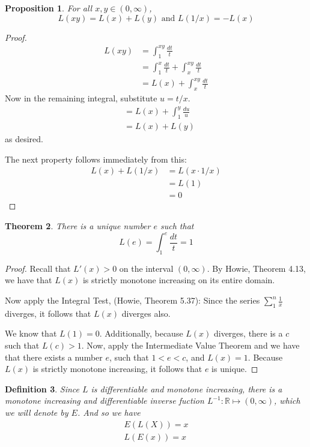 \documentclass[12pt]{article}
\theoremstyle{mystyle}
\newtheorem{thm}{Theorem}
\newtheorem{defn}[thm]{Definition}
\newtheorem{prop}[thm]{Proposition}
\newcommand{\R}{\mathbb{R}}
\begin{document}
\begin{prop}
  For all $x,y \in (0, \infty)$,
  $$ L(xy) = L(x) + L(y) \text{ and } L(1/x) = -L(x)$$
\end{prop}
\begin{proof}
  \begin{align*}
    L(xy) &= \int_{1}^{xy} \frac{dt}{t} \\
          &= \int_{1}^{x} \frac{dt}{t} + \int_{x}^{xy} \frac{dt}{t} \\
          &= L(x) + \int_{x}^{xy} \frac{dt}{t}
  \end{align*}
  Now in the remaining integral, substitute $u = t/x$. 
  \begin{align*}
          &= L(x) + \int_{1}^{y} \frac{du}{u} \\
          &= L(x) + L(y)
  \end{align*}
  as desired.
  
  The next property follows immediately from this:
  \begin{align*}
    L(x) + L(1/x) &= L(x \cdot 1/x) \\
                  &= L(1) \\
                  &= 0
  \end{align*}  

\end{proof}

\begin{thm}
  There is a unique number $e$ such that 
  $$ L(e) = \int_1^e \frac{dt}{t} = 1 $$
\end{thm}
\begin{proof}
  Recall that $L'(x) > 0$ on the interval $(0, \infty)$. By Howie,
  Theorem 4.13, we have that $L(x)$ is strictly monotone increasing on its 
  entire domain.
  
  Now apply the Integral Test, (Howie, Theorem 5.37): Since the series
  $\sum_1^n \frac{1}{x}$ diverges, it follows that $L(x)$ diverges also.
  
  We know that $L(1) = 0$. Additionally, because $L(x)$ diverges, there is a $c$
  such that $L(c) > 1$. Now, apply the Intermediate Value Theorem and we have
  that there exists a number $e$, such that $1 < e < c$, and $L(x) = 1$. Because
  $L(x)$ is strictly monotone increasing, it follows that $e$ is unique.
\end{proof}


\begin{defn}
  Since $L$ is differentiable and monotone increasing, there is a monotone
  increasing and differentiable inverse fuction $L^{-1}: \R \mapsto (0, \infty)$,
  which we will denote by $E$. And so we have
  \begin{align*}
    E(L(X)) = x \\
    L(E(x)) = x
  \end{align*} 
\end{defn}
\end{document}
